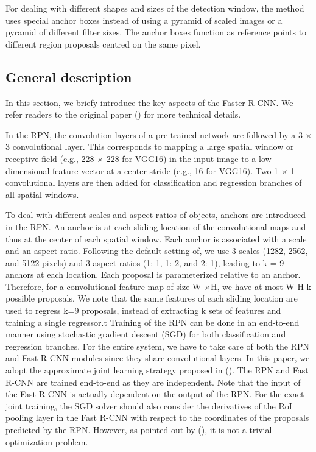For dealing with different shapes and sizes of the detection window, the method uses special anchor boxes instead of using a pyramid of scaled images or a pyramid of different filter sizes. The anchor boxes function as reference points to different region proposals centred on the same pixel.


\subsection{General description}
In this section, we briefy introduce the key aspects of the Faster R-CNN. We refer readers to the original paper (\cite{NIPS2015_5638}) for more technical details.

In the RPN, the convolution layers of a pre-trained network are followed by a 3 $\times$ 3 convolutional layer. This corresponds to mapping a large spatial window or receptive field (e.g., 228 $\times$ 228 for VGG16) in the input image to a low-dimensional feature vector at a center stride (e.g., 16 for VGG16). Two 1 $\times$ 1 convolutional layers are then added for classification and regression branches of all spatial windows.

To deal with different scales and aspect ratios of objects, anchors are introduced in the RPN. An anchor is at each sliding location of the convolutional maps and thus at the center of each spatial window. Each anchor is associated with a scale and an aspect ratio. Following the default setting of, we use 3 scales (1282, 2562, and 5122 pixels) and 3 aspect ratios (1: 1, 1: 2, and 2: 1), leading to k = 9 anchors at each location. Each proposal is parameterized relative to an anchor. Therefore, for a convolutional feature map of size W $\times$H, we have at most W H k possible proposals. We note that the same features of each sliding location are used to regress k=9 proposals, instead of extracting k sets of features and training a single regressor.t Training of the RPN can be done in an end-to-end manner using stochastic gradient descent (SGD) for both classification and regression branches. For the entire system, we have to take care of both the RPN and Fast R-CNN modules since they share convolutional layers. In this paper, we adopt the approximate joint learning strategy proposed in (\cite{NIPS2015_5638}). The RPN and Fast R-CNN are trained end-to-end as they are independent. Note that the input of the Fast R-CNN is actually dependent on the output of the RPN. For the exact joint training, the SGD solver should also consider the derivatives of the RoI pooling layer in the Fast R-CNN with respect to the coordinates of the proposals predicted by the RPN. However, as pointed out by (\cite{NIPS2015_5638}), it is not a trivial optimization problem.

